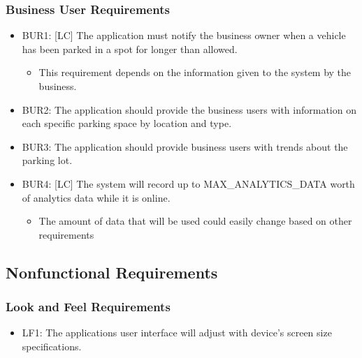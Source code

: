 \documentclass[]{article}
\begin{document}
\subsubsection{Business User Requirements}
\begin{itemize}
	\item BUR1: [LC] The application must notify the business owner when a vehicle has been parked in a spot for longer than allowed.
	\begin{itemize}
		\item This requirement depends on the information given to the system by the business.
	\end{itemize}
	\item BUR2:  The application should provide the business users with information on each specific parking space by location and type.
	\item BUR3: The application should provide business users with trends about the parking lot.
	\item BUR4: [LC] The system will record up to MAX\_ANALYTICS\_DATA worth of analytics data while it is online.
	\begin{itemize}
		\item The amount of data that will be used could easily change based on other requirements
	\end{itemize}
\end{itemize}

	
	

	
\subsection{Nonfunctional Requirements}
\subsubsection{Look and Feel Requirements}
\begin{itemize}
	\item LF1: The applications user interface will adjust with device’s screen size specifications.
\end{itemize}
\end{document}
